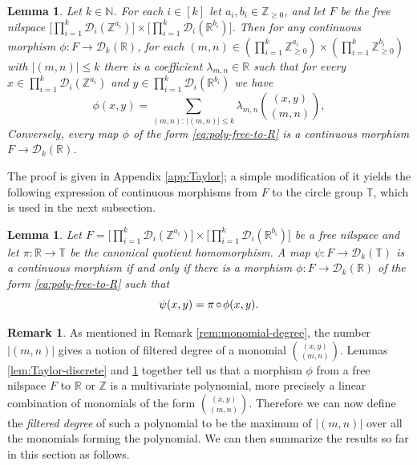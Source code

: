 \documentclass[a4paper,12pt,reqno]{amsart}
\newtheorem{lemma}[theorem]{Lemma}
\theoremstyle{definition}
\newtheorem{remark}[theorem]{Remark}
\def\to{\rightarrow}
\newcommand{\mc}{\mathcal}
\newcommand{\mb}{\mathbb}
\DeclareMathOperator{\co}{\circ\hspace{-0.02 cm}}
\begin{document}
\begin{lemma}\label{lem:poly-free-to-R}
Let $k\in \mb{N}$. For each $i\in [k]$ let $a_i,b_i\in\mb{Z}_{\ge 0}$, and let $F$ be the free nilspace $\big[\prod_{i=1}^k \mc{D}_i(\mb{Z}^{a_i})\big] \times \big[\prod_{i=1}^k \mc{D}_i( \mb{R}^{b_i})\big]$. Then for any continuous morphism $\phi:F\to \mc{D}_k(\mb{R})$, for each $(m,n)\in (\prod_{i=1}^k \mb{Z}_{\ge 0}^{a_i})\times (\prod_{i=1}^k \mb{Z}_{\ge 0}^{b_i})$ with $|(m,n)|\leq k$ there is a coefficient $\lambda_{m,n}\in \mb{R}$ such that for every $x\in \prod_{i=1}^k \mc{D}_i(\mb{Z}^{a_i})$ and $y\in \prod_{i=1}^k \mc{D}_i( \mb{R}^{b_i})$ we have
\begin{equation}\label{eq:poly-free-to-R}
\phi(x,y)=\sum_{(m,n):\,|(m,n)|\le k} \lambda_{m,n} \binom{(x,y)}{(m,n)},
\end{equation}
Conversely, every map $\phi$ of the form \eqref{eq:poly-free-to-R} is a continuous morphism $F\to\mc{D}_k(\mb{R})$.
\end{lemma}
\noindent The proof is given in Appendix \ref{app:Taylor}; a simple modification of it yields the following expression of continuous morphisms from $F$ to the circle group $\mb{T}$, which is used in the next subsection.
\begin{lemma}\label{lem:Taylor-cont}
Let $F=\big[\prod_{i=1}^k \mc{D}_i(\mb{Z}^{a_i})\big] \times \big[\prod_{i=1}^k \mc{D}_i( \mb{R}^{b_i})\big]$ be a free nilspace and let $\pi:\mb{R}\to\mb{T}$ be the canonical quotient homomorphism. A map $\psi:F\to \mc{D}_k(\mb{T})$ is a continuous morphism if and only if there is a morphism $\phi:F\to \mc{D}_k(\mb{R})$ of the form \eqref{eq:poly-free-to-R} such that
\begin{equation}\label{eq:Taylor-cont}
\psi(x,y)=\pi\co\phi(x,y).
\end{equation}
\end{lemma}



\begin{remark}\label{rem:poly-degree}
As mentioned in Remark \ref{rem:monomial-degree}, the number $|(m,n)|$ gives a notion of filtered degree of a monomial $\binom{(x,y)}{(m,n)}$. Lemmas \ref{lem:Taylor-discrete} and \ref{lem:poly-free-to-R} together tell us that a morphism $\phi$ from a free nilspace $F$ to $\mb{R}$ or $\mb{Z}$ is a multivariate polynomial, more precisely a linear combination of monomials of the form $\binom{(x,y)}{(m,n)}$. Therefore we can now define the \emph{filtered degree} of such a polynomial to be the maximum of $|(m,n)|$ over all the monomials forming the polynomial. We can then summarize the results so far in this section as follows.
\end{remark}
\end{document}
